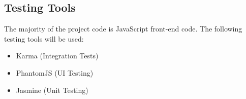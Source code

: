 \documentclass[12pt, titlepage]{article}
\begin{document}
\subsection{Testing Tools}
The majority of the project code is JavaScript front-end code. The following testing tools will be used:
\begin{itemize}
	\item Karma (Integration Tests)
	\item PhantomJS (UI Testing)
	\item Jasmine (Unit Testing) 
\end{itemize}



	
	



		
\end{document}
